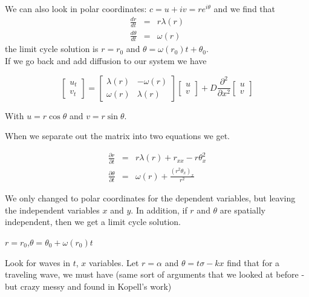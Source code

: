 \documentclass[]{article}
\numberwithin{equation}{section}		%
\def\bea{\begin{eqnarray}}
\def\ena{\end{eqnarray}}
\def\part#1{\frac{\partial #1}{\partial t}}
\def\dt#1{\frac{d#1}{dt}{}}
\def\parxx#1{\frac{\partial^{2}#1}{\partial x^{2}}}
\begin{document}
We can also look in polar coordinates: $c=u+iv = re^{i\theta}$ and we find that
\bea
\dt{r} &=& r\lambda(r) \nonumber \\
\dt{\theta} &=& \omega(r) \nonumber
\ena
the limit cycle solution is $r=r_0$ and $\theta = \omega(r_0) t + \theta_0$. \\




\noindent If we go back and add diffusion to our system we have

$$\begin{bmatrix}
u_t \\
v_t
\end{bmatrix} =
 \begin{bmatrix}
\lambda(r) & -\omega(r) \\
\omega(r) & \lambda(r)
\end{bmatrix}
\begin{bmatrix}
u \\
v
\end{bmatrix} +D\parxx{}
\begin{bmatrix}
u\\
v
\end{bmatrix}$$

\noindent With $u=r\cos\theta$ and $v=r\sin\theta$.

\noindent When we separate out the matrix into two equations we get.

\bea
\part{r}&=&r\lambda(r)+r_{xx}-r\theta_x^2 \nonumber\\
\part{\theta}&=&\omega(r)+\frac{(r^2\theta_x)_x}{r^2}\nonumber
\ena

\noindent We only changed to polar coordinates for the dependent variables, but leaving the independent variables $x$ and $y$. In addition, if $r$ and $\theta$ are spatially independent, then we get a limit cycle solution.

\begin{center}
$r=r_0$,\hspace{0.25in}$\theta=\theta_0+\omega(r_0)t$
\end{center}

\noindent Look for waves in $t$, $x$ variables. Let $r=\alpha$ and $\theta=t\sigma-kx$ find that for a traveling wave, we must have (same sort of arguments that we looked at before - but crazy messy and found in Kopell's work)
\end{document}
